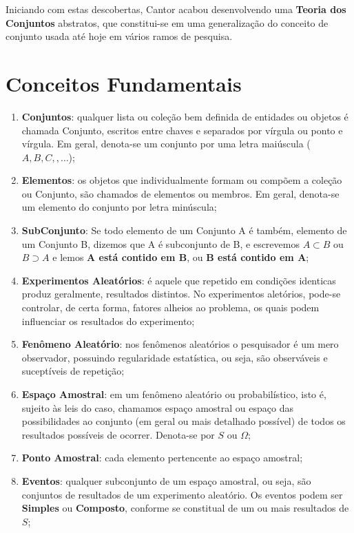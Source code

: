\inic Iniciando com estas descobertas, Cantor acabou desenvolvendo uma \textbf{Teoria dos Conjuntos} abstratos, que constitui-se em uma generalização do conceito de conjunto usada até hoje em vários ramos de pesquisa. 


\section{Conceitos Fundamentais}

\begin{enumerate}
  \item \textbf{Conjuntos}: qualquer lista ou coleção bem definida de entidades ou objetos é chamada Conjunto, escritos entre chaves e separados por vírgula ou ponto e vírgula. Em geral, denota-se um conjunto por uma letra maiúscula ($A,B,C,,\ldots$);
  \item \textbf{Elementos}: os objetos que individualmente formam ou compõem a coleção ou Conjunto, são chamados de elementos ou membros. Em geral, denota-se um elemento do conjunto por letra minúscula;
     \item \textbf{SubConjunto}: Se todo elemento de um Conjunto A é também, elemento de um Conjunto B, dizemos que A é subconjunto de B, e escrevemos $A \subset B$ ou $B \supset A$ e lemos \textbf{A está contido em B}, ou \textbf{B está contido em A};
  \item \textbf{Experimentos Aleatórios}: é aquele que repetido em condições identicas produz geralmente, resultados distintos. No experimentos aletórios, pode-se controlar, de certa forma, fatores alheios ao problema, os quais podem influenciar os resultados do experimento;
  \item \textbf{Fenômeno Aleatório}: nos fenômenos aleatórios o pesquisador é um mero observador, possuindo regularidade estatística, ou seja, são observáveis e suceptíveis de repetição; 
   \item \textbf{Espaço Amostral}: em um fenômeno aleatório ou probabilístico, isto é, sujeito às leis do caso, chamamos espaço amostral ou espaço das possibilidades ao conjunto (em geral ou mais detalhado possível) de todos os resultados possíveis de ocorrer. Denota-se por $S$ ou $\Omega$; 
   \item \textbf{Ponto Amostral}: cada elemento pertencente ao espaço amostral;
   \item \textbf{Eventos}: qualquer subconjunto de um espaço amostral, ou seja, são conjuntos de resultados de um experimento aleatório. Os eventos podem ser \textbf{Simples} ou \textbf{Composto}, conforme se constitual de um ou mais resultados de $S$; 
\end{enumerate}
 
